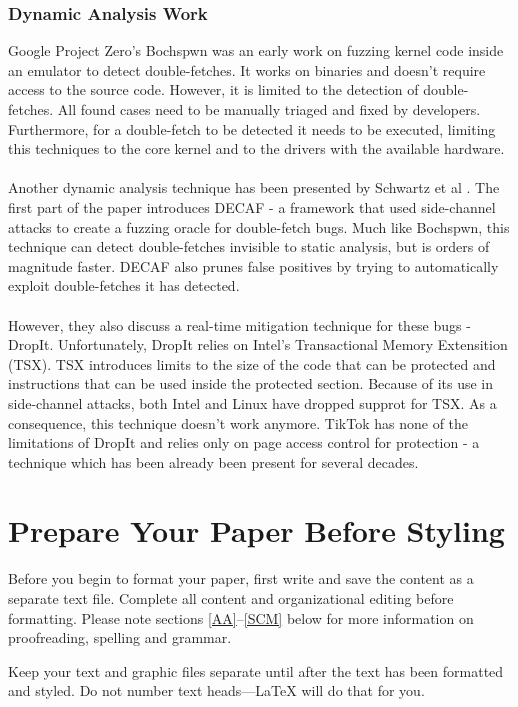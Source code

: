 \documentclass[conference]{IEEEtran}
\begin{document}
\subsubsection{Dynamic Analysis Work}
Google Project Zero's Bochspwn \cite{bochspwn} was an early work on fuzzing kernel code inside an emulator to detect double-fetches. It works on binaries and doesn't require access to the source code.
However, it is limited to the detection of double-fetches. All found cases need to be manually triaged and fixed by developers. Furthermore, for a double-fetch to be detected it needs
to be executed, limiting this techniques to the core kernel and to the drivers with the available hardware.
\\
\\
Another dynamic analysis technique has been presented by Schwartz et al \cite{schwarz18}. The first part of the paper introduces DECAF - a framework that used side-channel attacks to
create a fuzzing oracle for double-fetch bugs. Much like Bochspwn, this technique can detect double-fetches invisible to static analysis, but is orders of magnitude faster. DECAF also prunes
false positives by trying to automatically exploit double-fetches it has detected.
\\
\\
However, they also discuss a real-time mitigation technique for these bugs - DropIt. Unfortunately, DropIt relies 
on Intel's Transactional Memory Extensition (TSX). TSX introduces limits to the size of the code that can be protected and instructions that can be used inside the protected section. Because
of its use in side-channel attacks, both Intel and Linux have dropped supprot for TSX. As a consequence, this technique doesn't work anymore. TikTok has none of the limitations of DropIt and
relies only on page access control for protection - a technique which has been already been present for several decades.


\section{Prepare Your Paper Before Styling}
Before you begin to format your paper, first write and save the content as a 
separate text file. Complete all content and organizational editing before 
formatting. Please note sections \ref{AA}--\ref{SCM} below for more information on 
proofreading, spelling and grammar.

Keep your text and graphic files separate until after the text has been 
formatted and styled. Do not number text heads---{\LaTeX} will do that 
for you.
\end{document}
